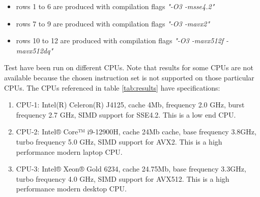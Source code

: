 \documentclass[preprint,1p,times]{elsarticle}
\begin{document}
			\begin{itemize}
				\item rows 1 to 6 are produced with compilation flags \textit{"-O3 -msse4.2"}
				\item rows 7 to 9 are produced with compilation flags \textit{"-O3 -mavx2"}
				\item rows 10 to 12 are produced with compilation flags \textit{"-O3 -mavx512f -mavx512dq"}
			\end{itemize}
			Test have been run on different CPUs. Note that results for some CPUs are not available because the chosen instruction set is not supported on those particular CPUs. The CPUs referenced in table \ref{tab:results} have specifications:
			\begin{enumerate}
				\item CPU-1: Intel(R) Celeron(R) J4125, cache 4Mb, frequency 2.0 GHz, burst frequency 2.7 GHz, SIMD support for SSE4.2. This is a low end CPU.
				\item CPU-2: Intel® Core™ i9-12900H, cache 24Mb cache, base frequency 3.8GHz, turbo frequency 5.0 GHz, SIMD support for AVX2. This is a high performance modern laptop CPU.
				\item CPU-3: Intel® Xeon® Gold 6234, cache 24.75Mb, base frequency 3.3GHz, turbo frequency 4.0 GHz, SIMD support for AVX512. This is a high performance modern desktop CPU.
			\end{enumerate}
			
\end{document}
